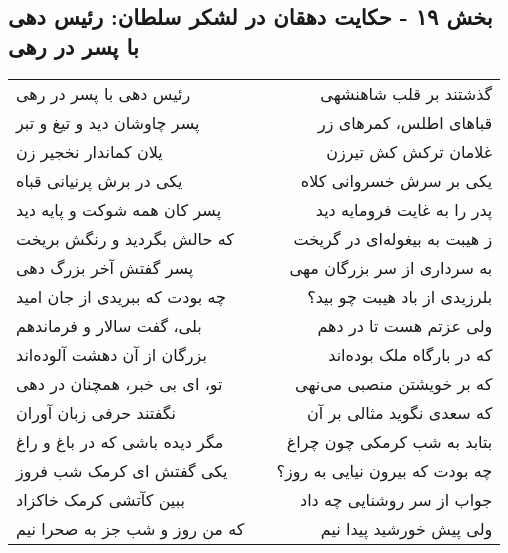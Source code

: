 \begin{center}
\section*{بخش ۱۹ - حکایت دهقان در لشکر سلطان: رئیس دهی با پسر در رهی}
\label{sec:019}
\begin{longtable}{l p{0.5cm} r}
رئیس دهی با پسر در رهی
&&
گذشتند بر قلب شاهنشهی
\\
پسر چاوشان دید و تیغ و تبر
&&
قباهای اطلس، کمرهای زر
\\
یلان کماندار نخجیر زن
&&
غلامان ترکش کش تیرزن
\\
یکی در برش پرنیانی قباه
&&
یکی بر سرش خسروانی کلاه
\\
پسر کان همه شوکت و پایه دید
&&
پدر را به غایت فرومایه دید
\\
که حالش بگردید و رنگش بریخت
&&
ز هیبت به بیغوله‌ای در گریخت
\\
پسر گفتش آخر بزرگ دهی
&&
به سرداری از سر بزرگان مهی
\\
چه بودت که ببریدی از جان امید
&&
بلرزیدی از باد هیبت چو بید؟
\\
بلی، گفت سالار و فرماندهم
&&
ولی عزتم هست تا در دهم
\\
بزرگان از آن دهشت آلوده‌اند
&&
که در بارگاه ملک بوده‌اند
\\
تو، ای بی خبر، همچنان در دهی
&&
که بر خویشتن منصبی می‌نهی
\\
نگفتند حرفی زبان آوران
&&
که سعدی نگوید مثالی بر آن
\\
مگر دیده باشی که در باغ و راغ
&&
بتابد به شب کرمکی چون چراغ
\\
یکی گفتش ای کرمک شب فروز
&&
چه بودت که بیرون نیایی به روز؟
\\
ببین کآتشی کرمک خاکزاد
&&
جواب از سر روشنایی چه داد
\\
که من روز و شب جز به صحرا نیم
&&
ولی پیش خورشید پیدا نیم
\\
\end{longtable}
\end{center}
